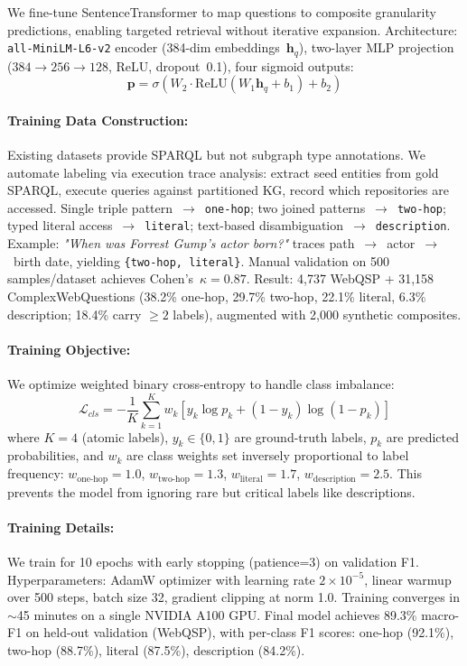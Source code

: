 \documentclass[conference]{IEEEtran}
\begin{document}
We fine-tune SentenceTransformer \cite{reimers2019sentencebert} to map questions to composite granularity predictions, enabling targeted retrieval without iterative expansion. Architecture: \texttt{all-MiniLM-L6-v2} encoder (384-dim embeddings~$\mathbf{h}_q$), two-layer MLP projection ($384{\to}256{\to}128$, ReLU, dropout~0.1), four sigmoid outputs:
\begin{equation}
\mathbf{p} = \sigma(W_2 \cdot \text{ReLU}(W_1 \mathbf{h}_q + b_1) + b_2)
\end{equation}

\paragraph{Training Data Construction:}
\label{sec:training_data}
Existing datasets provide SPARQL but not subgraph type annotations. We automate labeling via execution trace analysis: extract seed entities from gold SPARQL, execute queries against partitioned KG, record which repositories are accessed. Single triple pattern~${\to}$~\texttt{one-hop}; two joined patterns~${\to}$~\texttt{two-hop}; typed literal access~${\to}$~\texttt{literal}; text-based disambiguation~${\to}$~\texttt{description}. Example: \emph{"When was Forrest Gump's actor born?"} traces path~${\to}$~actor~${\to}$~birth date, yielding \texttt{\{two-hop, literal\}}. Manual validation on 500 samples/dataset achieves Cohen's~$\kappa{=}0.87$. Result: 4,737 WebQSP + 31,158 ComplexWebQuestions (38.2\% one-hop, 29.7\% two-hop, 22.1\% literal, 6.3\% description; 18.4\% carry ${\geq}2$ labels), augmented with 2,000 synthetic composites.

\paragraph{Training Objective:}
We optimize weighted binary cross-entropy to handle class imbalance:
\begin{equation}
\mathcal{L}_{cls} = -\frac{1}{K}\sum_{k=1}^K w_k \left[ y_k \log p_k + (1-y_k)\log (1-p_k)\right]
\end{equation}
where $K=4$ (atomic labels), $y_k \in \{0,1\}$ are ground-truth labels, $p_k$ are predicted probabilities, and $w_k$ are class weights set inversely proportional to label frequency: $w_{\text{one-hop}}=1.0$, $w_{\text{two-hop}}=1.3$, $w_{\text{literal}}=1.7$, $w_{\text{description}}=2.5$. This prevents the model from ignoring rare but critical labels like descriptions.

\paragraph{Training Details:}
We train for 10 epochs with early stopping (patience=3) on validation F1. Hyperparameters: AdamW optimizer \cite{loshchilov2017adamw} with learning rate $2 \times 10^{-5}$, linear warmup over 500 steps, batch size 32, gradient clipping at norm 1.0. Training converges in $\sim$45 minutes on a single NVIDIA A100 GPU. Final model achieves 89.3\% macro-F1 on held-out validation (WebQSP), with per-class F1 scores: one-hop (92.1\%), two-hop (88.7\%), literal (87.5\%), description (84.2\%).
\end{document}

